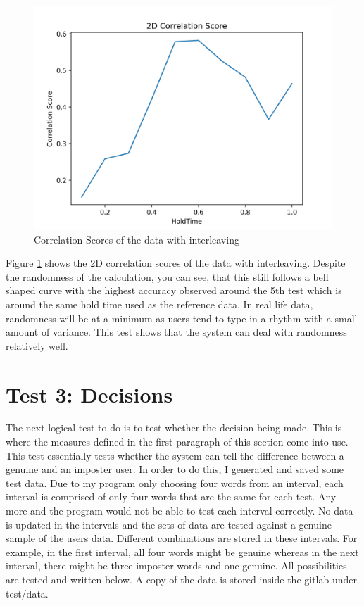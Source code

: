 \documentclass[10pt,a4paper]{report}
\begin{document}
\begin{figure}
	\centering
	\includegraphics[scale=0.6]{CorrGraph2}
	\caption{Correlation Scores of the data with interleaving}
	\label{fig:CorrInter}
\end{figure}

Figure \ref{fig:CorrInter} shows the 2D correlation scores of the data with interleaving. Despite the randomness of the calculation, you can see, that this still follows a bell shaped curve with the highest accuracy observed around the 5th test which is around the same hold time used as the reference data. In real life data, randomness will be at a minimum as users tend to type in a rhythm with a small amount of variance. This test shows that the system can deal with randomness relatively well.

\section{Test 3: Decisions}

The next logical test to do is to test whether the decision being made. This is where the measures defined in the first paragraph of this section come into use. This test essentially tests whether the system can tell the difference between a genuine and an imposter user. In order to do this, I generated and saved some test data. Due to my program only choosing four words from an interval, each interval is comprised of only four words that are the same for each test. Any more and the program would not be able to test each interval correctly. No data is updated in the intervals and the sets of data are tested against a genuine sample of the users data. Different combinations are stored in these intervals. For example, in the first interval, all four words might be genuine whereas in the next interval, there might be three imposter words and one genuine. All possibilities are tested and written below. A copy of the data is stored inside the gitlab under test/data.
\end{document}
